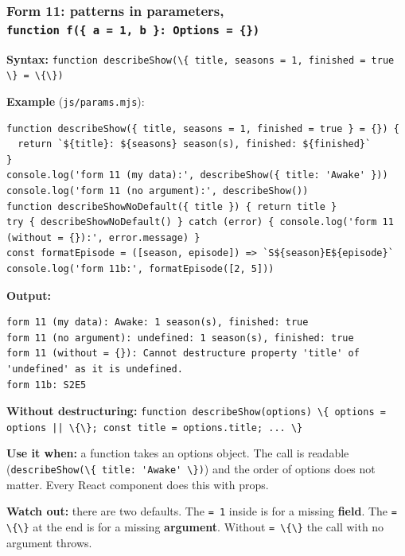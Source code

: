 \documentclass[
  10pt,
]{article}
\newcommand{\passthrough}[1]{#1}
\begin{document}
\hypertarget{form-11-patterns-in-parameters-function-f-a-1-b-options}{%
\subsubsection{\texorpdfstring{Form 11: patterns in parameters,
\texttt{function\ f(\{\ a\ =\ 1,\ b\ \}:\ Options\ =\ \{\})}}{Form 11: patterns in parameters, function f(\{ a = 1, b \}: Options = \{\})}}\label{form-11-patterns-in-parameters-function-f-a-1-b-options}}

\textbf{Syntax:}
\passthrough{\lstinline!function describeShow(\{ title, seasons = 1, finished = true \} = \{\})!}

\textbf{Example} (\passthrough{\lstinline!js/params.mjs!}):

\begin{lstlisting}
function describeShow({ title, seasons = 1, finished = true } = {}) {
  return `${title}: ${seasons} season(s), finished: ${finished}`
}
console.log('form 11 (my data):', describeShow({ title: 'Awake' }))
console.log('form 11 (no argument):', describeShow())
function describeShowNoDefault({ title }) { return title }
try { describeShowNoDefault() } catch (error) { console.log('form 11 (without = {}):', error.message) }
const formatEpisode = ([season, episode]) => `S${season}E${episode}`
console.log('form 11b:', formatEpisode([2, 5]))
\end{lstlisting}

\textbf{Output:}

\begin{lstlisting}
form 11 (my data): Awake: 1 season(s), finished: true
form 11 (no argument): undefined: 1 season(s), finished: true
form 11 (without = {}): Cannot destructure property 'title' of 'undefined' as it is undefined.
form 11b: S2E5
\end{lstlisting}

\textbf{Without destructuring:}
\passthrough{\lstinline!function describeShow(options) \{ options = options || \{\}; const title = options.title; ... \}!}

\textbf{Use it when:} a function takes an options object. The call is
readable (\passthrough{\lstinline!describeShow(\{ title: 'Awake' \})!})
and the order of options does not matter. Every React component does
this with props.

\textbf{Watch out:} there are two defaults. The
\passthrough{\lstinline!= 1!} inside is for a missing \textbf{field}.
The \passthrough{\lstinline!= \{\}!} at the end is for a missing
\textbf{argument}. Without \passthrough{\lstinline!= \{\}!} the call
with no argument throws.
\end{document}
